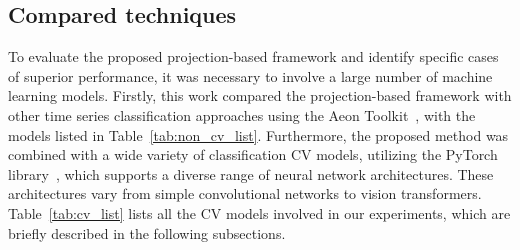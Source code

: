 \documentclass[final,3p,times,twocolumn]{elsarticle}
\begin{document}
\subsection{Compared techniques}

To evaluate the proposed projection-based framework and identify specific cases of superior performance, it was necessary to involve a large number of machine learning models.
Firstly, this work compared the projection-based framework with other time series classification approaches using the Aeon Toolkit~\cite{aeon2024}, with the models listed in Table~\ref{tab:non_cv_list}.
Furthermore, the proposed method was combined with a wide variety of classification \gls{CV} models, utilizing the PyTorch library~\cite{pytorch}, which supports a diverse range of neural network architectures.
These architectures vary from simple convolutional networks to vision transformers.
Table~\ref{tab:cv_list} lists all the \gls{CV} models involved in our experiments, which are briefly described in the following subsections.
\end{document}
